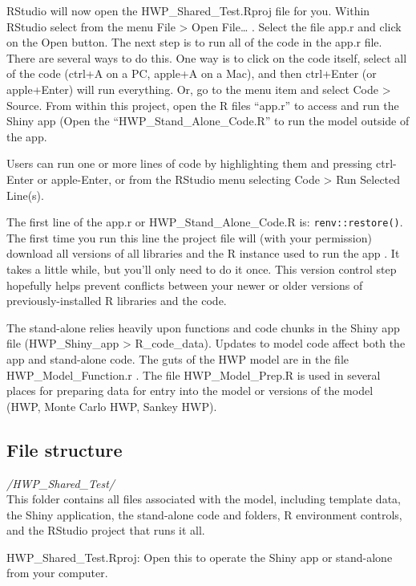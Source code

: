 \documentclass[
]{book}
\begin{document}
RStudio will now open the HWP\_Shared\_Test.Rproj file for you. Within RStudio select from the menu File \textgreater{} Open File\ldots{} . Select the file app.r and click on the Open button. The next step is to run all of the code in the app.r file. There are several ways to do this. One way is to click on the code itself, select all of the code (ctrl+A on a PC, apple+A on a Mac), and then ctrl+Enter (or apple+Enter) will run everything. Or, go to the menu item and select Code \textgreater{} Source. From within this project, open the R files ``app.r'' to access and run the Shiny app (Open the ``HWP\_Stand\_Alone\_Code.R'' to run the model outside of the app.

Users can run one or more lines of code by highlighting them and pressing ctrl-Enter or apple-Enter, or from the RStudio menu selecting Code \textgreater{} Run Selected Line(s).

The first line of the app.r or HWP\_Stand\_Alone\_Code.R is: \texttt{renv::restore()}. The first time you run this line the project file will (with your permission) download all versions of all libraries and the R instance used to run the app \citep{R-renv}. It takes a little while, but you'll only need to do it once. This version control step hopefully helps prevent conflicts between your newer or older versions of previously-installed R libraries and the code.

The stand-alone relies heavily upon functions and code chunks in the Shiny app file (HWP\_Shiny\_app \textgreater{} R\_code\_data). Updates to model code affect both the app and stand-alone code. The guts of the HWP model are in the file HWP\_Model\_Function.r . The file HWP\_Model\_Prep.R is used in several places for preparing data for entry into the model or versions of the model (HWP, Monte Carlo HWP, Sankey HWP).

\hypertarget{run-opp-files}{%
\subsection{File structure}\label{run-opp-files}}

\emph{/HWP\_Shared\_Test/}\\
This folder contains all files associated with the model, including template data, the Shiny application, the stand-alone code and folders, R environment controls, and the RStudio project that runs it all.

HWP\_Shared\_Test.Rproj: Open this to operate the Shiny app or stand-alone from your computer.
\end{document}
